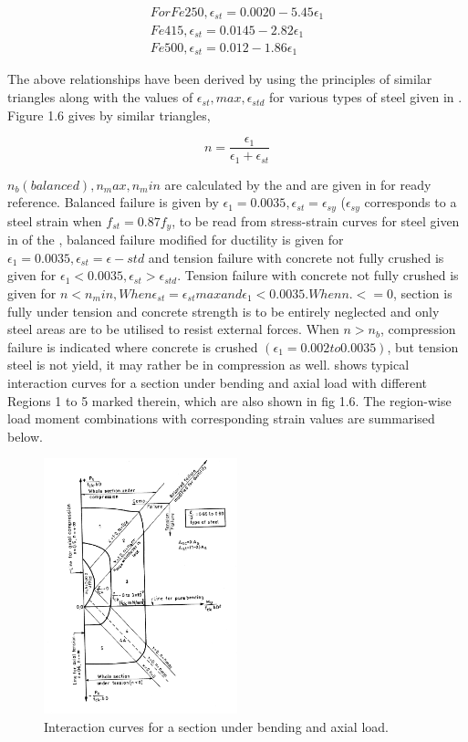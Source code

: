 \begin{align}
For 
Fe 250,\epsilon_{st}=0.0020-5.45\epsilon_1\\
Fe 415,\epsilon_{st}=0.0145-2.82\epsilon_1\\
Fe 500,\epsilon_{st}=0.012-1.86\epsilon_1
\end{align}

The above relationships have been derived by using the principles of
similar triangles along with the values of $\epsilon_{st}, max, \epsilon_{std}$
for various types of steel given in . Figure 1.6 gives by
similar triangles,

\begin{equation}
n=\frac{\epsilon_1}{\epsilon_1+\epsilon_{st}}
\end{equation}

$n_b (balanced), n_max, n_min$ are calculated by the  and are
given in  for ready reference. Balanced failure is given by
$\epsilon_1 = 0.0035, \epsilon_{st} =\epsilon_{sy}$ ($\epsilon_{sy}$
corresponds to a steel strain when $f_{st} = 0.87 f_y$, to be read from
stress-strain curves for steel given in  of the
, balanced failure modiﬁed for ductility is given for
$\epsilon_1 = 0.0035, \epsilon_{st} = \epsilon-{std}$ and tension failure
with concrete not fully crushed is given for
$\epsilon_1 < 0.0035, \epsilon_{st} > \epsilon_{std}$. Tension failure 
with concrete not fully crushed is given for
$n < n_min, When \epsilon_{st} = \epsilon_{st}max and\epsilon_1 < 0.0035. When n .<= 0$, 
section is fully under tension and concrete strength is to be entirely
neglected and only steel areas are to be utilised to resist external
forces. When $n>n_b$, compression failure is indicated where concrete
is crushed $(\epsilon_1= 0.002 to 0.0035)$, but tension steel is not
yield, it may rather be in compression as well.  shows typical
interaction curves for a section under bending and axial load with
different Regions 1 to 5 marked therein, which are also shown in fig 1.6.
The region-wise load moment combinations with corresponding strain values
are summarised below.

\begin{figure}
\centering
\includegraphics[width=0.5\textwidth]{images/exported.png}
\caption{Interaction curves for a section under bending and axial load.}
\label{fig:exported}
\end{figure}

